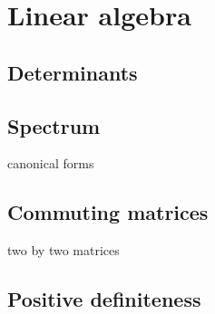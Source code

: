 \documentclass{../../large}
\begin{document}
\chapter{Linear algebra}


\section{Determinants}

\section{Spectrum}
canonical forms

\section{Commuting matrices}
two by two matrices

\section{Positive definiteness}
\end{document}
